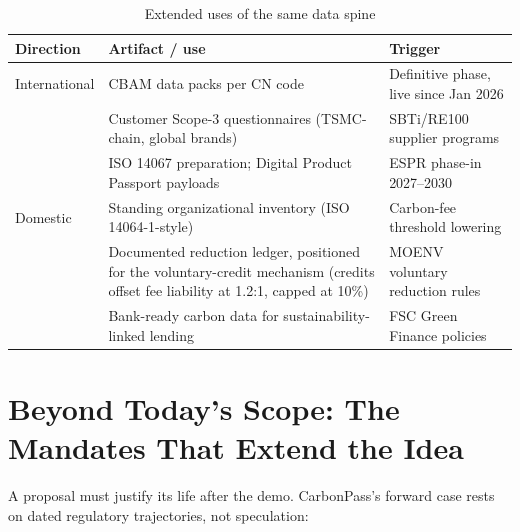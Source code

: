 \begin{table}[htbp]
\caption{Extended uses of the same data spine}
\label{tab:extended}
\small
\begin{tabularx}{\textwidth}{@{}p{}Xp{}@{}}
\toprule
\textbf{Direction} & \textbf{Artifact / use} & \textbf{Trigger} \\
\midrule
International & CBAM data packs per CN code & Definitive phase, live since Jan 2026\cite{taxud} \\
 & Customer Scope-3 questionnaires (TSMC-chain, global brands) & SBTi/RE100 supplier programs\cite{tsmc} \\
 & ISO 14067 preparation; Digital Product Passport payloads & ESPR phase-in 2027--2030\cite{espr} \\
\addlinespace
Domestic & Standing organizational inventory (ISO 14064-1-style) & Carbon-fee threshold lowering\cite{ecobiz} \\
 & Documented reduction ledger, positioned for the voluntary-credit mechanism (credits offset fee liability at 1.2:1, capped at 10\%) & MOENV voluntary reduction rules\cite{offset} \\
 & Bank-ready carbon data for sustainability-linked lending & FSC Green Finance policies \\
\bottomrule
\end{tabularx}
\end{table}

\section{Beyond Today's Scope: The Mandates That Extend the Idea}\label{sec:future}

A proposal must justify its life after the demo. CarbonPass's forward case
rests on dated regulatory trajectories, not speculation:


